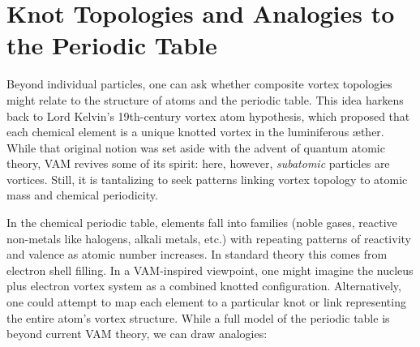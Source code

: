 
\section{Knot Topologies and Analogies to the Periodic Table}

Beyond individual particles, one can ask whether composite vortex topologies might relate to the structure of atoms and the periodic table. This idea harkens back to Lord Kelvin's 19th-century vortex atom hypothesis, which proposed that each chemical element is a unique knotted vortex in the luminiferous æther. While that original notion was set aside with the advent of quantum atomic theory, VAM revives some of its spirit: here, however, \textit{subatomic} particles are vortices. Still, it is tantalizing to seek patterns linking vortex topology to atomic mass and chemical periodicity.

In the chemical periodic table, elements fall into families (noble gases, reactive non-metals like halogens, alkali metals, etc.) with repeating patterns of reactivity and valence as atomic number increases. In standard theory this comes from electron shell filling. In a VAM-inspired viewpoint, one might imagine the nucleus plus electron vortex system as a combined knotted configuration. Alternatively, one could attempt to map each element to a particular knot or link representing the entire atom's vortex structure. While a full model of the periodic table is beyond current VAM theory, we can draw analogies:

